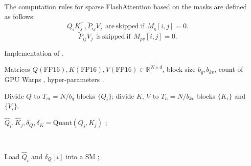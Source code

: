 \begin{definition}
    The computation rules for sparse FlashAttention based on the masks are defined as follows:
    \begin{equation}
        Q_i K_j^\top, \widetilde{P}_{ij} V_j \mathrm{~~are~ skipped~ if~~ } M_{g}[i,j] = 0.
    \end{equation}
    \begin{equation}
        \widetilde{P}_{ij} V_j \mathrm{ ~~is~ skipped~ if~~ } M_{pv}[i,j] = 0.
    \end{equation}
\end{definition}





\begin{algorithm*}[t!]
    \small
    \caption{Implementation of \our.}
    \label{alg:our} 
    \begin{algorithmic}[1]
     {Matrices $Q(\text{FP16}), K(\text{FP16}), V(\text{FP16}) \in \mathbb{R}^{N \times d}$, block size $b_q, b_{kv}$, count of GPU Warps , hyper-parameters .}

    \STATE Divide $Q$ to $T_m = {N}/{b_q}$ blocks $\{Q_i\}$; divide $K$, $V$ to $T_n = {N}/{b_{kv}}$ blocks $\{K_i\}$ and $\{V_i\}$.

    \STATE $\hat Q_i, \hat K_j, \delta_Q, \delta_K = \mathrm{Quant}(Q_i, K_j)$ ;  

    \STATE {}

    \STATE {}
    
    \STATE {}
    ~~

        
        \STATE Load $\hat Q_i$ and $\delta_Q[i]$ into a SM ;


            \label{alg:condition1}  


\end{algorithmic}
\end{algorithm*}
